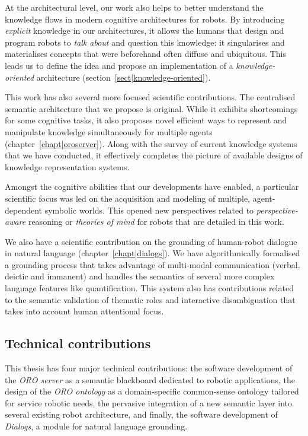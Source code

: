 At the architectural level, our work also helps to better understand the
knowledge flows in modern cognitive architectures for robots. By introducing
\emph{explicit} knowledge in our architectures, it allows the humans that
design and program robots to \emph{talk about} and question this knowledge: it
singularises and materialises concepts that were beforehand often diffuse and
ubiquitous. This leads us to define the idea and propose an implementation of a
\emph{knowledge-oriented} architecture (section~\ref{sect|knowledge-oriented}).

This work has also several more focused scientific contributions. The
centralised semantic architecture that we propose is original. While it
exhibits shortcomings for some cognitive tasks, it also proposes novel
efficient ways to represent and manipulate knowledge simultaneously for
multiple agents (chapter~\ref{chapt|oroserver}). Along with the survey of
current knowledge systems that we have conducted, it effectively completes the
picture of available designs of knowledge representation systems.

Amongst the cognitive abilities that our developments have enabled, a
particular scientific focus was led on the acquisition and modeling of
multiple, agent-dependent symbolic worlds. This opened new perspectives related
to \emph{perspective-aware} reasoning or \emph{theories of mind} for robots
that are detailed in this work.

We also have a scientific contribution on the grounding of human-robot dialogue
in natural language (chapter~\ref{chapt|dialogs}). We have algorithmically
formalised a grounding process that takes advantage of multi-modal
communication (verbal, deictic and immanent) and handles the semantics of
several more complex language features like quantification. This system also
has contributions related to the semantic validation of thematic roles and
interactive disambiguation that takes into account human attentional focus.

\subsection{Technical contributions}
\label{sect|technical-contributions}


This thesis has four major technical contributions: the software development of
the \emph{ORO server} as a semantic blackboard dedicated to robotic
applications, the design of the \emph{ORO ontology} as a domain-specific
common-sense ontology tailored for service robotic needs, the pervasive
integration of a new semantic layer into several existing robot architecture,
and finally, the software development of \emph{Dialogs}, a module for natural
language grounding.

